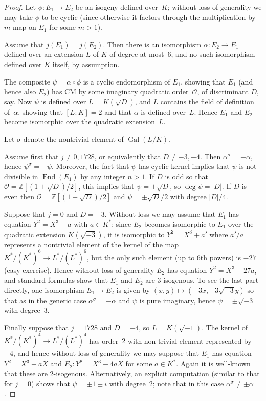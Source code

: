 \documentclass{article}
\def\Z{{\mathbb Z}}
\def\OO{{\mathcal O}}
\DeclareMathOperator{\Gal}{Gal}
\DeclareMathOperator{\End}{End}
\begin{document}
\begin{proof}
Let $\phi:E_1\to E_2$ be an isogeny defined over~$K$; without loss of
generality we may take $\phi$ to be cyclic (since otherwise it factors
through the multiplication-by-$m$ map on $E_1$ for some $m>1$).

Assume that $j(E_1)=j(E_2)$.  Then there is an isomorphism
$\alpha:E_2\to E_1$ defined over an extension $L$ of $K$ of degree at
most~$6$, and no such isomorphism defined over $K$ itself, by
assumption.

The composite $\psi=\alpha\circ\phi$ is a cyclic endomorphism of
$E_1$, showing that $E_1$ (and hence also $E_2$) has CM by some
imaginary quadratic order~$\OO$, of discriminant $D$, say.  Now $\psi$
is defined over $L=K(\sqrt{D})$, and $L$ contains the field of
definition of~$\alpha$, showing that $[L:K]=2$ and that $\alpha$ is
defined over~$L$.  Hence $E_1$ and $E_2$ become isomorphic over the
quadratic extension~$L$.

Let $\sigma$ denote the nontrivial element of $\Gal(L/K)$.

Assume first that $j\not=0, 1728$, or equivalently that $D\not=-3,-4$.
Then $\alpha^{\sigma}=-\alpha$, hence $\psi^{\sigma}=-\psi$.
Moreover, the fact that $\psi$ has cyclic kernel implies that $\psi$
is not divisible in $\End(E_1)$ by any integer $n>1$.  If $D$ is odd
so that $\OO=\Z[(1+\sqrt{D})/2]$, this implies that
$\psi=\pm\sqrt{D}$, so $\deg\psi=|D|$.  If $D$ is even then
$\OO=\Z[(1+\sqrt{D})/2]$ and $\psi=\pm\sqrt{D}/2$ with degree $|D|/4$.

Suppose that $j=0$ and $D=-3$.  Without loss we may assume that $E_1$
has equation $Y^2=X^3+a$ with $a\in K^*$; since $E_2$ becomes
isomorphic to $E_1$ over the quadratic extension $K(\sqrt{-3})$, it is
isomorphic to $Y^2=X^3+a'$ where $a'/a$ represents a nontrivial
element of the kernel of the map $K^*/(K^*)^6 \to L^*/(L^*)^6$, but
the only such element (up to 6th powers) is $-27$ (easy exercise).
Hence without loss of generality $E_2$ has equation $Y^2=X^3-27a$, and
standard formulas show that $E_1$ and $E_2$ are $3$-isogenous.  To see
the last part directly, one isomorphism $E_1\to E_2$ is given by
$(x,y)\mapsto(-3x,-3\sqrt{-3}y)$ so that as in the generic case
$\alpha^{\sigma}=-\alpha$ and $\psi$ is pure imaginary, hence
$\psi=\pm\sqrt{-3}$ with degree~$3$.

Finally suppose that $j=1728$ and $D=-4$, so $L=K(\sqrt{-1})$.  The
kernel of $K^*/(K^*)^4 \to L^*/(L^*)^4$ has order~$2$ with non-trivial
element represented by~$-4$, and hence without loss of generality we
may suppose that $E_1$ has equation $Y^2=X^3+aX$ and $E_2:
Y^2=X^3-4aX$ for some $a\in K^*$.  Again it is well-known that these
are $2$-isogenous.  Alternatively, an explicit computation (similar to
that for $j=0$) shows that $\psi=\pm1\pm i$ with degree~$2$; note that
in this case $\alpha^{\sigma}\not=\pm\alpha$.


\end{proof}
\end{document}
